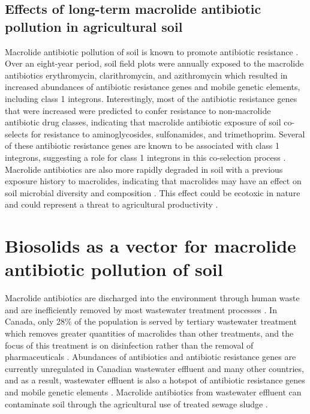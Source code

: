 \subsection{Effects of long-term macrolide antibiotic pollution in agricultural soil}

Macrolide antibiotic pollution of soil is known to promote antibiotic resistance \parencite{Lau.2020}.
Over an eight-year period, soil field plots were annually exposed to the macrolide antibiotics erythromycin, clarithromycin, and azithromycin which resulted in increased abundances of antibiotic resistance genes and mobile genetic elements, including class 1 integrons.
Interestingly, most of the antibiotic resistance genes that were increased were predicted to confer resistance to non-macrolide antibiotic drug classes, indicating that macrolide antibiotic exposure of soil co-selects for resistance to aminoglycosides, sulfonamides, and trimethoprim.
Several of these antibiotic resistance genes are known to be associated with class 1 integrons, suggesting a role for class 1 integrons in this co-selection process \parencite{Lau.2020}.
Macrolide antibiotics are also more rapidly degraded in soil with a previous exposure history to macrolides, indicating that macrolides may have an effect on soil microbial diversity and composition \parencite{Topp.2016}.
This effect could be ecotoxic in nature and could represent a threat to agricultural productivity \parencite{Prashar.2014}.

\section{Biosolids as a vector for macrolide antibiotic pollution of soil}

Macrolide antibiotics are discharged into the environment through human waste and are inefficiently removed by most wastewater treatment processes \parencite{LeMinh.2010, Luo.2014}.
In Canada, only 28\% of the population is served by tertiary wastewater treatment which removes greater quantities of macrolides than other treatments, and the focus of this treatment is on disinfection rather than the removal of pharmaceuticals \parencite{EnvironmentandClimateChangeCanada.2020, LeMinh.2010}.
Abundances of antibiotics and antibiotic resistance genes are currently unregulated in Canadian wastewater effluent and many other countries, and as a result, wastewater effluent is also a hotspot of antibiotic resistance genes and mobile genetic elements \parencite{Rizzo.2013, Che.2019}.
Macrolide antibiotics from wastewater effluent can contaminate soil through the agricultural use of treated sewage sludge \parencite{McClellan.2010, Sabourin.2012}.

